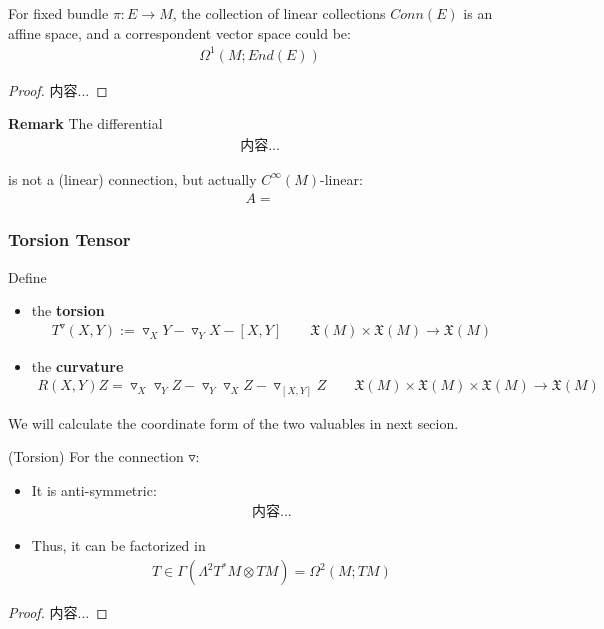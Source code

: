 \documentclass[Total.tex]{subfiles}
\begin{document}
		
		\begin{corollary}
			For fixed bundle $\pi:E\rightarrow M$, the collection of linear collections $Conn(E)$ is an affine space, and a correspondent vector space could be:
			\begin{gather*}
				\Omega^1(M;End(E))
			\end{gather*}
		\end{corollary}
		\begin{proof}
			内容...
		\end{proof}
		
		\textbf{Remark} The differential 
		\begin{gather*}
			内容...
		\end{gather*}
		
		is not a (linear) connection, but actually $C^\infty(M)$-linear:
		\begin{gather*}
			A=
		\end{gather*}
		
		\subsubsection{Torsion Tensor}
		\begin{Def}
			Define 
			\begin{itemize}
				\item the \textbf{torsion}
				\begin{gather*}
					T^\triangledown(X,Y):=\triangledown_X Y-\triangledown_Y X-[X,Y]\qquad \mathfrak{X}(M)\times \mathfrak{X}(M)\rightarrow \mathfrak{X}(M)
				\end{gather*}
				\item the \textbf{curvature}
				\begin{gather*}
					R(X,Y)Z=\triangledown_X\triangledown_Y Z-\triangledown_Y\triangledown_XZ-\triangledown_{[X,Y]}Z\qquad \mathfrak{X}(M)\times \mathfrak{X}(M)\times \mathfrak{X}(M)\rightarrow \mathfrak{X}(M)
				\end{gather*}
			\end{itemize}
		\end{Def}
		
		We will calculate the coordinate form of the two valuables in next secion. 
		
		\begin{proposition}
			(Torsion) For the connection $\triangledown$:
			\begin{itemize}
				\item It is anti-symmetric:
				\begin{gather*}
					内容...
				\end{gather*}
				\item Thus, it can be factorized in 
				\begin{gather*}
					T\in \Gamma(\Lambda^2 T^* M\otimes TM)=\Omega^2(M;TM)
				\end{gather*}
			\end{itemize}
		\end{proposition}
		\begin{proof}
			内容...
		\end{proof}
		
\end{document}
